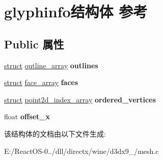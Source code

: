 \hypertarget{structglyphinfo}{}\section{glyphinfo结构体 参考}
\label{structglyphinfo}
\subsection*{Public 属性}
\begin{DoxyCompactItemize}
\item 
\mbox{\label{structglyphinfo_ae36ccb7cb14519fc438e969e351b7524}} 
\hyperlink{interfacestruct}{struct} \hyperlink{structoutline__array}{outline\+\_\+array} {\bfseries outlines}
\item 
\mbox{\label{structglyphinfo_accd2ae5b0fe8f74542fcdb0d0504e855}} 
\hyperlink{interfacestruct}{struct} \hyperlink{structface__array}{face\+\_\+array} {\bfseries faces}
\item 
\mbox{\label{structglyphinfo_a8673c6094401de18608da1c44715caf7}} 
\hyperlink{interfacestruct}{struct} \hyperlink{structpoint2d__index__array}{point2d\+\_\+index\+\_\+array} {\bfseries ordered\+\_\+vertices}
\item 
\mbox{\label{structglyphinfo_a80d0ed479faf57f565094aa0b845563e}} 
float {\bfseries offset\+\_\+x}
\end{DoxyCompactItemize}


该结构体的文档由以下文件生成\+:\begin{DoxyCompactItemize}
\item 
E\+:/\+React\+O\+S-\/0../dll/directx/wine/d3dx9\+\_/mesh.\+c\end{DoxyCompactItemize}
